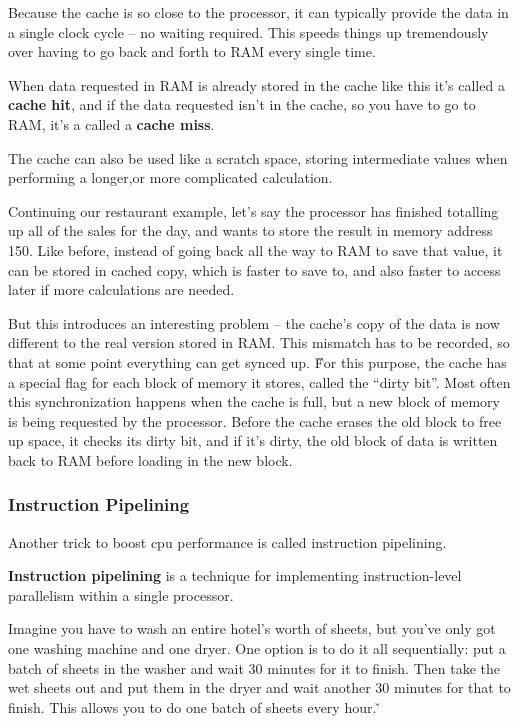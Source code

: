 Because the cache is so close to the processor, it can typically provide the data in a single clock cycle -- no
waiting required. This speeds things up tremendously over having to go back and forth to RAM every single time.

When data requested in RAM is already stored in the cache like this it's called a \textbf{cache hit}, and if the data
requested isn't in the cache, so you have to go to RAM, it's a called a \textbf{cache miss}.
\ed

The cache can also be used like a scratch space, storing intermediate values when performing a longer,or more
complicated calculation.

\be
Continuing our restaurant example, let's say the processor has finished totalling up all of the sales for the day,
and wants to store the result in memory address 150. Like before, instead of going back all the way to RAM to save
that value, it can be stored in cached copy, which is faster to save to, and also faster to access later if more
calculations are needed.
\ee

But this introduces an interesting problem -- the cache's copy of the data is now different to the real version
stored in RAM. This mismatch has to be recorded, so that at some point everything can get synced up. \v

For this purpose, the cache has a special flag for each block of memory it stores, called the ``dirty bit''. Most
often this synchronization happens when the cache is full, but a new block of memory is being requested by the
processor. Before the cache erases the old block to free up space, it checks its dirty bit, and if it's dirty, the
old block of data is written back to RAM before loading in the new block.

\subsubsection{Instruction Pipelining}

Another trick to boost cpu performance is called instruction pipelining.

\textbf{Instruction pipelining} is a technique for implementing instruction-level parallelism within a single processor.
\ed

\be
Imagine you have to wash an entire hotel's worth of sheets, but you've only got one washing machine and one dryer.
One option is to do it all sequentially: put a batch of sheets in the washer and wait 30 minutes for it to finish.
Then take the wet sheets out and put them in the dryer and wait another 30 minutes for that to finish. This allows
you to do one batch of sheets every hour. \v


